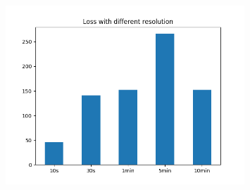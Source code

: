 \documentclass[aspectratio=169,11pt,hyperref={colorlinks=true}]{beamer}
\begin{document}
\begin{frame}
\begin{columns}
\begin{center}
\begin{figure}
        \end{figure}
        \begin{figure}
          \includegraphics[width=0.8\textwidth,height=0.4\textheight]{graphs/loss_by_sampling-status.png}
        \end{figure}
      \end{center}
  \end{columns}
\end{frame}
\end{document}
